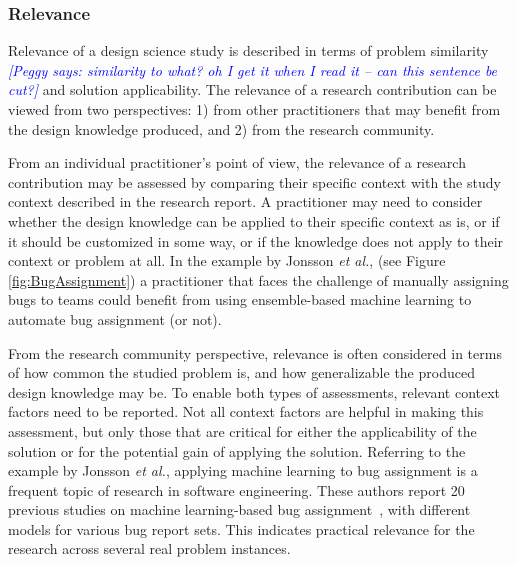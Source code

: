\documentclass[graybox]{svmult}
\newcommand{\peggy}[1]{\textcolor{blue}{{\it [Peggy says: #1]}}}
\newcommand{\peggy}[1]{}
\begin{document}

\subsubsection{Relevance} 

Relevance of a design science study is described in terms of problem similarity \peggy{similarity to what? oh I get it when I read it -- can this sentence be cut?} and solution applicability. The relevance of a research contribution can be viewed from two perspectives: 1) from other practitioners that may benefit from the design knowledge produced, and 2) from the research community. 

From an individual practitioner's point of view, the relevance of a research contribution may be assessed by comparing their specific context with the study context described in the research report. 
A practitioner may need to consider whether the design knowledge can be applied to their specific context as is, or if it should be customized in some way, or if the knowledge does not apply to their context or problem at all.
In the example by Jonsson \emph{et al.}, (see Figure \ref{fig:BugAssignment}) a practitioner that faces the challenge of manually assigning bugs to teams could benefit from using ensemble-based machine learning to automate bug assignment (or not).

From the research community perspective, relevance is often considered in terms of how common the studied problem is, and how generalizable the produced design knowledge may be. To enable both types of assessments, relevant context factors need to be reported. Not all context factors are helpful in making this assessment, but only those that are critical for either the applicability of the solution or for the potential gain of applying the solution. 
Referring to the example by Jonsson \emph{et al.}, applying machine learning to bug assignment is a frequent topic of research in software engineering. These authors report 20 previous studies on machine learning-based bug assignment~\cite[Fig.2]{JonssonBug15}, with different models for various bug report sets. This indicates practical relevance for the research across several real problem instances. 
\end{document}
